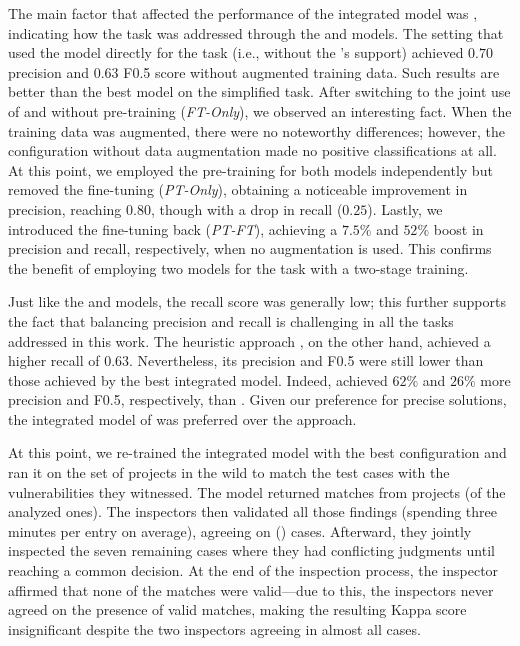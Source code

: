 The main factor that affected the performance of the integrated model was \glbMode, indicating how the \matching task was addressed through the \finder and \linker models.
The setting that used the \linker model directly for the \matching task (i.e., without the \finder's support) achieved $0.70$ precision and $0.63$ F0.5 score without augmented training data.
Such results are better than the best \linker model on the simplified task.
%
After switching to the joint use of \finder and \linker without pre-training (\textsl{FT-Only}), we observed an interesting fact.
When the training data was augmented, there were no noteworthy differences; however, the configuration without data augmentation made no positive classifications at all.
%
At this point, we employed the pre-training for both models independently but removed the fine-tuning (\textsl{PT-Only}), obtaining a noticeable improvement in precision, reaching $0.80$, though with a drop in recall ($0.25$).
Lastly, we introduced the fine-tuning back (\textsl{PT-FT}), achieving a $7.5\%$ and $52\%$ boost in precision and recall, respectively, when no augmentation is used.
This confirms the benefit of employing two models for the \matching task with a two-stage training.



Just like the \finder and \linker models, the recall score was generally low; this further supports the fact that balancing precision and recall is challenging in all the tasks addressed in this work. 
The heuristic approach \fixCommits, on the other hand, achieved a higher recall of $0.63$.
Nevertheless, its precision and F0.5 were still lower than those achieved by the best integrated model.
Indeed, \vuteco achieved $62\%$ and $26\%$ more precision and F0.5, respectively, than \fixCommits.
Given our preference for precise solutions, the integrated model of \vuteco was preferred over the \fixCommits approach.

At this point, we re-trained the integrated model with the best configuration and ran it on the set of \Java projects in the wild to match the test cases with the vulnerabilities they witnessed.
The model returned \invivoMatchingResults matches from \invivoMatchingResultsProjects projects (\invivoMatchingResultsProjectsPerc of the analyzed ones).
The inspectors then validated all those findings (spending three minutes per entry on average), agreeing on \invivoMatchingAgreement (\invivoMatchingAgreementPerc) cases.
Afterward, they jointly inspected the seven remaining cases where they had conflicting judgments until reaching a common decision.
At the end of the inspection process, the inspector affirmed that none of the matches were valid---due to this, the inspectors never agreed on the presence of valid matches, making the resulting Kappa score insignificant despite the two inspectors agreeing in almost all cases.

